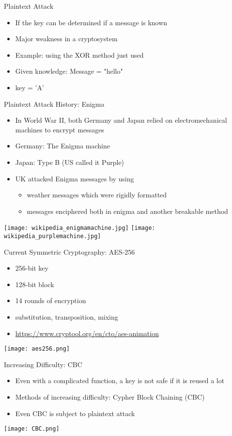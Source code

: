 \begin{withoutheadline}
\begin{frame}{Plaintext Attack}
\begin{itemize}
    \item If the key can be determined if a message is known
    \item Major weakness in a cryptosystem
    \item Example: using the XOR method just used
    \item Given knowledge: Message = "hello"
    \item key = 'A'
\end{itemize}
\end{frame}

\begin{frame}{Plaintext Attack History: Enigma}
\begin{itemize}
    \item In World War II, both Germany and Japan relied on electromechanical machines to encrypt messages
    \item Germany: The Enigma machine
    \item Japan: Type B (US called it Purple)
    \item UK attacked Enigma messages by using
    \begin{itemize} 
        \item weather messages which were rigidly formatted
        \item messages enciphered both in enigma and another breakable method
    \end{itemize}
\end{itemize}
\texttt{[image: wikipedia\_enigmamachine.jpg]}
\texttt{[image: wikipedia\_purplemachine.jpg]}
\end{frame}

\begin{frame}{Current Symmetric Cryptography: AES-256}
    \begin{itemize}
        \item 256-bit key
        \item 128-bit block
        \item 14 rounds of encryption
        \item substitution, transposition, mixing
        \item \url{https://www.cryptool.org/en/cto/aes-animation}
    \end{itemize}
    \texttt{[image: aes256.png]}
\end{frame}

\begin{frame}{Increasing Difficulty: CBC}
    \begin{itemize}
        \item Even with a complicated function, a key is not safe if it is reused a lot
        \item Methods of increasing difficulty: Cypher Block Chaining (CBC)
        \item Even CBC is subject to plaintext attack
    \end{itemize}
    \texttt{[image: CBC.png]}
\end{frame}


\end{withoutheadline}
